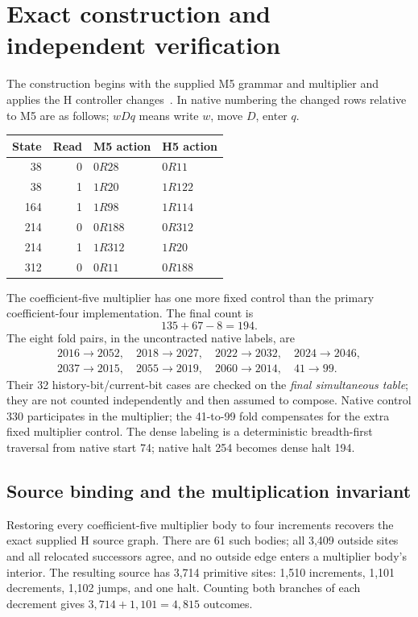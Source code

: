\documentclass[11pt]{article}
\theoremstyle{definition}\newtheorem{definition}[theorem]{Definition}
\begin{document}
\section{Exact construction and independent verification}
\label{sec:verification}

The construction begins with the supplied M5 grammar and multiplier and
applies the H controller changes~\cite{radix,h6}. In native numbering the changed rows
relative to M5 are as follows; $wDq$ means write $w$, move $D$, enter $q$.
\begin{center}
\begin{tabular}{@{}rrll@{}}
\toprule
State & Read & M5 action & H5 action\\
\midrule
38&0&$0R28$&$0R11$\\
38&1&$1R20$&$1R122$\\
164&1&$1R98$&$1R114$\\
214&0&$0R188$&$0R312$\\
214&1&$1R312$&$1R20$\\
312&0&$0R11$&$0R188$\\
\bottomrule
\end{tabular}
\end{center}

The coefficient-five multiplier has one more fixed control than the
primary coefficient-four implementation. The final count is
\[
              \boxed{135+67-8=194.}
\]
The eight fold pairs, in the uncontracted native labels, are
\[
\begin{gathered}
2016\to2052,\quad2018\to2027,\quad2022\to2032,\quad2024\to2046,\\
2037\to2015,\quad2055\to2019,\quad2060\to2014,\quad41\to99.
\end{gathered}
\]
Their 32 history-bit/current-bit cases are checked on the \emph{final
simultaneous table}; they are not counted independently and then assumed
to compose. Native control 330 participates in the multiplier; the
41-to-99 fold compensates for the extra fixed multiplier control. The dense labeling
is a deterministic breadth-first traversal from native start 74; native
halt 254 becomes dense halt 194.

\subsection{Source binding and the multiplication invariant}

Restoring every coefficient-five multiplier body to four increments
recovers the exact supplied H source graph. There are 61 such bodies;
all 3,409 outside sites and all relocated successors agree, and no outside
edge enters a multiplier body's interior. The resulting source has
3,714 primitive sites: 1,510 increments, 1,101 decrements, 1,102 jumps,
and one halt. Counting both branches of each decrement gives
$3,714+1,101=4,815$ outcomes.
\end{document}

